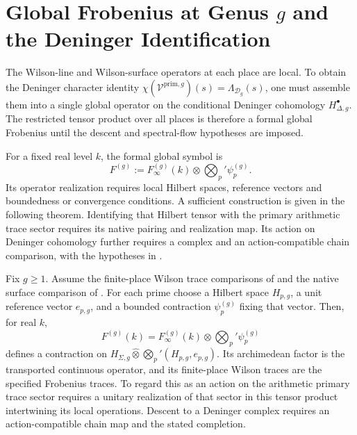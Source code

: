 \section{Global Frobenius at Genus \(g\) and the Deninger Identification}
\label{v4-arith:w9-r6:deninger-g}

The Wilson-line and Wilson-surface operators at each place are local.
To obtain the Deninger character identity
\(\chi(\mathcal{V}^{\mathrm{prim},g})(s)=\Lambda_{\mathcal{D}_{g}}(s)\), one
must assemble them into a single global operator on the conditional
Deninger cohomology \(H^{\bullet}_{\Delta,g}\). The restricted tensor
product over all places is therefore a formal global Frobenius until
the descent and spectral-flow hypotheses are imposed.

\begin{definition}
\label{v4-arith:w9-r6:def:global-F-g}
For a fixed real level \(k\), the formal global symbol is
\begin{equation}
 F^{(g)}:=F^{(g)}_\infty(k)\otimes\bigotimes_p'\psi_p^{(g)}.
 \label{v4-arith:w9-r6:eq:global-F-g}
\end{equation}
Its operator realization requires local Hilbert spaces, reference
vectors and boundedness or convergence conditions. A sufficient
construction is given in the following theorem. Identifying that
Hilbert tensor with the primary arithmetic trace sector requires
its native pairing and realization map. Its action on Deninger
cohomology further requires a complex and an action-compatible
chain comparison, with the hypotheses in
.
\end{definition}
\begin{theorem}
\label{v4-arith:w9-r6:thm:global-F-g-wilson}
Fix $g\ge1$. Assume the finite-place Wilson trace comparisons of
 and the native surface
comparison of .
For each prime choose a Hilbert space \(H_{p,g}\), a unit reference
vector \(e_{p,g}\), and a bounded contraction \(\psi_p^{(g)}\)
fixing that vector. Then, for real \(k\),
\[
 F^{(g)}(k)=F_\infty^{(g)}(k)\otimes\bigotimes_p'\psi_p^{(g)}
\]
defines a contraction on
\(H_{\Sigma,g}\widehat\otimes\bigotimes_p'(H_{p,g},e_{p,g})\).
Its archimedean factor is the transported continuous operator,
and its finite-place Wilson traces are the specified Frobenius traces.
To regard this as an action on the arithmetic primary trace sector
requires a unitary realization of that sector in this tensor product
intertwining its local operations. Descent to a Deninger complex
requires an action-compatible chain map and the stated completion.
\end{theorem}
